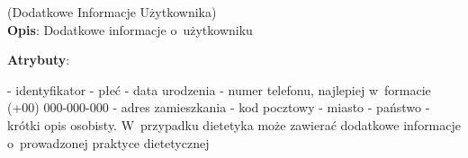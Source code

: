 \begin{enumerate}[label={\textbf{KAT/0/\protect\twodigits{\theenumi}}}, wide, labelwidth=!, labelindent=0pt, labelsep=0pt, series=reqs]
    \label{kat:UserExtraInfo} (Dodatkowe Informacje Użytkownika)\\
    \indent\textbf{Opis}: Dodatkowe informacje o~użytkowniku
    \par
    \textbf{Atrybuty}:
    \begin{itemize}[series=atr, wide, align=left, leftmargin=190pt]
        \label{kat:UserExtraInfo:id}- identyfikator
        \label{kat:UserExtraInfo:gender}- płeć
        \label{kat:UserExtraInfo:dateOfBirth}- data urodzenia
        \label{kat:UserExtraInfo:phoneNumber}- numer telefonu, najlepiej w~formacie (+00) 000-000-000
        \label{kat:UserExtraInfo:streetAddress}- adres zamieszkania
        \label{kat:UserExtraInfo:postalCode}- kod pocztowy
        \label{kat:UserExtraInfo:city}- miasto
        \label{kat:UserExtraInfo:country}- państwo
        \label{kat:UserExtraInfo:personalDescription}- krótki opis osobisty. W~przypadku dietetyka może zawierać dodatkowe informacje o~prowadzonej praktyce dietetycznej
    \end{itemize}


\end{enumerate}
